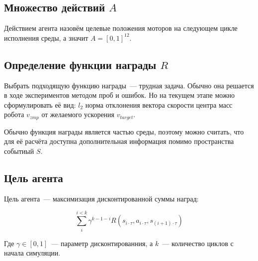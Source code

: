 \subsection{Множество действий $A$}
Действием агента назовём целевые положения моторов на следующем цикле исполнения среды, а значит $A = {[0, 1]}^{12}$.

\subsection{Определение функции награды $R$}
Выбрать подходящую функцию награды~---  трудная задача. Обычно она решается в ходе экспериментов методом проб и ошибок. Но на текущем этапе можно сформулировать её вид: $l_2$ норма отклонения вектора скорости центра масс робота $v_{zmp}$ от желаемого ускорения $v_{target}$.

Обычно функция награды является частью среды, поэтому можно считать, что для её расчёта доступна дополнительная информация помимо пространства событиый $S$.

\subsection{Цель агента}

Цель агента~--- максимизация дисконтированной суммы наград:

$$
\sum\limits_{i}^{i < k} \gamma ^{k - 1 - i} R(s_{i \cdot \tau}, a_{i \cdot \tau}, s_{(i+1) \cdot \tau})
$$

Где $\gamma \in [0, 1]$~--- параметр дисконтированния, а $k$~--- количество циклов с начала симуляции. 